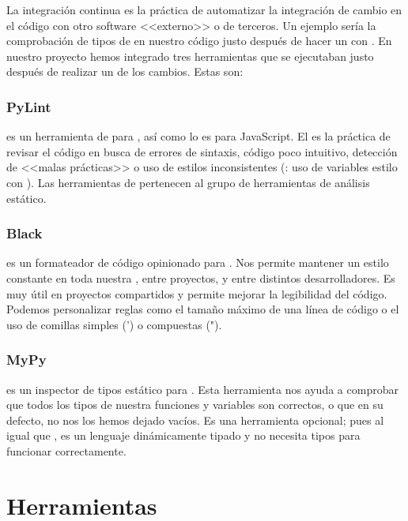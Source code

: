 La integración continua es la práctica de automatizar la integración de cambio en el código con otro software <<externo>> o de terceros. Un ejemplo sería la comprobación de tipos de en nuestro código justo después de hacer un  con . En nuestro proyecto hemos integrado tres herramientas que se ejecutaban justo después de realizar un  de los cambios. Estas son:

\subsubsection{PyLint}

 es un herramienta de  para , así como  lo es para JavaScript. El  es la práctica de revisar el código en busca de errores de sintaxis, código poco intuitivo, detección de <<malas prácticas>> o uso de estilos inconsistentes (\pe: uso de variables estilo  con ). Las herramientas de  pertenecen al grupo de herramientas de análisis estático.

\subsubsection{Black}

 es un formateador de código opinionado para . Nos permite mantener un estilo constante en toda nuestra , entre proyectos, y entre distintos desarrolladores. Es muy útil en proyectos compartidos y permite mejorar la legibilidad del código. Podemos personalizar reglas como el tamaño máximo de una línea de código o el uso de comillas simples (') o compuestas (").

\subsubsection{MyPy}

 es un inspector de tipos estático para . Esta herramienta nos ayuda a comprobar que todos los tipos de nuestra funciones y variables son correctos, o que en su defecto, no nos los hemos dejado vacíos. Es una herramienta opcional; pues al igual que ,  es un lenguaje dinámicamente tipado y no necesita tipos para funcionar correctamente.


\section{Herramientas}

